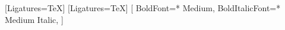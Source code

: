 \renewcommand*{\raggedsignature}{\raggedright} %

\setmainfont{Source Sans Pro}[Ligatures=TeX]
\setsansfont{Source Sans Pro}[Ligatures=TeX]
\setmonofont{Source Code Pro}[
  BoldFont={* Medium},
  BoldItalicFont={* Medium Italic},
]
